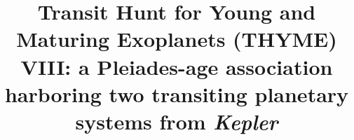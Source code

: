 \documentclass[twocolumn, linenumbers]{aastex631}
\newcommand{\kepler}{{\it Kepler}}
\begin{document}
\title{Transit Hunt for Young and Maturing Exoplanets (THYME) VIII: a Pleiades-age association harboring two transiting planetary systems from \kepler}









\end{document}
